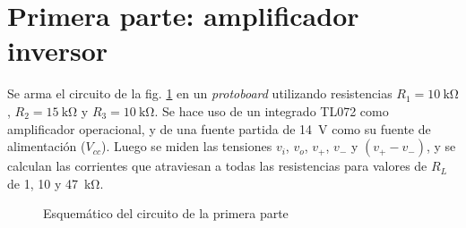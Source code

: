 \section{Primera parte: amplificador inversor}

Se arma el circuito de la fig. \ref{fig:1:esquema} en un \textit{protoboard}
utilizando resistencias $R_1 = \SI{10}{\kilo\ohm}$, $R_2 = \SI{15}{\kilo\ohm}$ y
$R_3 = \SI{10}{\kilo\ohm}$. Se hace uso de un integrado TL072 como amplificador
operacional, y de una fuente partida de \SI{14}{\volt} como su fuente de 
alimentación ($V_{cc}$). Luego se miden las tensiones $v_i$, $v_o$, $v_{+}$,
$v_{-}$ y $\left(v_{+} - v_{-}\right)$, y se calculan las corrientes que
atraviesan a todas las resistencias para valores de $R_L$ de 1, 10 y
\SI{47}{\kilo\ohm}.

\begin{figure}[H]
    \centering
    
    \caption{Esquemático del circuito de la primera parte}
    \label{fig:1:esquema}
\end{figure}









% 
